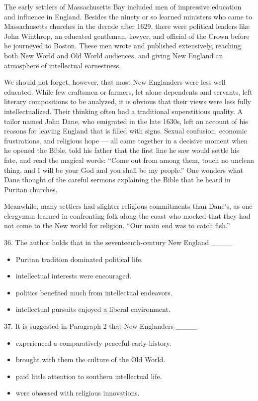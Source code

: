 \documentclass[UTF8,11pt]{ctexart}
\begin{document}
The early settlers of Massachusetts Bay included men of impressive education and influence in England. Besides the ninety or so learned ministers who came to Massachusetts churches in the decade after 1629, there were political leaders like John Winthrop, an educated gentleman, lawyer, and official of the Crown before he journeyed to Boston. These men wrote and published extensively, reaching both New World and Old World audiences, and giving New England an atmosphere of intellectual earnestness.


We should not forget, however, that most New Englanders were less well educated. While few craftsmen or farmers, let alone dependents and servants, left literary compositions to be analyzed, it is obvious that their views were less fully intellectualized. Their thinking often had a traditional superstitious quality. A tailor named John Dane, who emigrated in the late 1630s, left an account of his reasons for leaving England that is filled with signs. Sexual confusion, economic frustrations, and religious hope — all came together in a decisive moment when he opened the Bible, told his father that the first line he saw would settle his fate, and read the magical words: “Come out from among them, touch no unclean thing, and I will be your God and you shall be my people.” One wonders what Dane thought of the careful sermons explaining the Bible that he heard in Puritan churches.


Meanwhile, many settlers had slighter religious commitments than Dane’s, as one clergyman learned in confronting folk along the coast who mocked that they had not come to the New world for religion. “Our main end was to catch fish.”


36. The author holds that in the seventeenth-century New England \_\_\_\_


\begin{itemize}[leftmargin=2em,itemsep=.2em,topsep=.4em]\item[A.] Puritan tradition dominated political life.
\item[B.] intellectual interests were encouraged.
\item[C.] politics benefited much from intellectual endeavors.
\item[D.] intellectual pursuits enjoyed a liberal environment.
\end{itemize}

37. It is suggested in Paragraph 2 that New Englanders \_\_\_\_


\begin{itemize}[leftmargin=2em,itemsep=.2em,topsep=.4em]\item[A.] experienced a comparatively peaceful early history.
\item[B.] brought with them the culture of the Old World.
\item[C.] paid little attention to southern intellectual life.
\item[D.] were obsessed with religious innovations.
\end{itemize}
\end{document}

